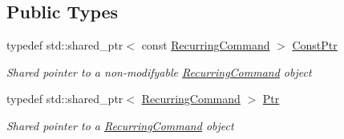 \subsection*{Public Types}
\begin{DoxyCompactItemize}
\item 
typedef std\+::shared\+\_\+ptr$<$ const \mbox{\hyperlink{class_command_lib_1_1_recurring_command}{Recurring\+Command}} $>$ \mbox{\hyperlink{class_command_lib_1_1_recurring_command_a99bd5afbc77fa5d574fd0804146f0858}{Const\+Ptr}}
\begin{DoxyCompactList}\small\item\em Shared pointer to a non-\/modifyable \mbox{\hyperlink{class_command_lib_1_1_recurring_command}{Recurring\+Command}} object\end{DoxyCompactList}\item 
typedef std\+::shared\+\_\+ptr$<$ \mbox{\hyperlink{class_command_lib_1_1_recurring_command}{Recurring\+Command}} $>$ \mbox{\hyperlink{class_command_lib_1_1_recurring_command_a458574df1804d7f1e4ba75e7aeb701e5}{Ptr}}
\begin{DoxyCompactList}\small\item\em Shared pointer to a \mbox{\hyperlink{class_command_lib_1_1_recurring_command}{Recurring\+Command}} object\end{DoxyCompactList}\end{DoxyCompactItemize}

